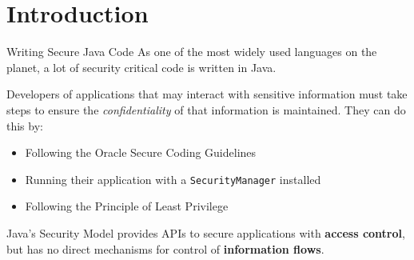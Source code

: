 \section{Introduction}

\begin{frame}{Writing Secure Java Code}
	As one of the most widely used languages on the planet, a lot of security critical code is written in Java.
	
	Developers of applications that may interact with sensitive information must take steps to ensure the \textit{confidentiality} of that information is maintained. They can do this by:
	
	\begin{itemize}
		\item Following the Oracle Secure Coding Guidelines
		\item Running their application with a \texttt{SecurityManager} installed
		\item Following the Principle of Least Privilege
	\end{itemize}
	
	Java's Security Model provides APIs to secure applications with \textbf{access control}, but has no direct mechanisms for control of \textbf{information flows}.
\end{frame}

